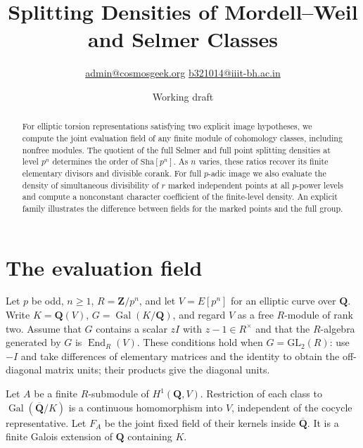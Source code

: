 \documentclass[11pt]{article}
\title{Splitting Densities of Mordell--Weil and Selmer Classes}
\author{\small\href{mailto:admin@cosmosgeek.org}{admin@cosmosgeek.org}
\quad\href{mailto:b321014@iiit-bh.ac.in}{b321014@iiit-bh.ac.in}}
\date{Working draft}
\newcommand{\Q}{\mathbf Q}
\newcommand{\Z}{\mathbf Z}
\newcommand{\Sha}{\mathrm{Sha}}
\newcommand{\GL}{\mathrm{GL}}
\begin{document}
\maketitle
\begin{abstract}
For elliptic torsion representations satisfying two explicit image
hypotheses, we compute the joint evaluation field of any finite module of
cohomology classes, including nonfree modules. The quotient of the full
Selmer and full point splitting densities at level $p^n$ determines the
order of $\Sha[p^n]$. As $n$ varies, these ratios recover its finite
elementary divisors and divisible corank. For full $p$-adic image we also
evaluate the density of simultaneous divisibility of $r$ marked independent
points at all $p$-power levels and compute a nonconstant character
coefficient of the finite-level density. An explicit family illustrates
the difference between fields for the marked points and the full group.
\end{abstract}

\section{The evaluation field}
Let $p$ be odd, $n\ge1$, $R=\Z/p^n$, and let $V=E[p^n]$ for an
elliptic curve over $\Q$. Write $K=\Q(V)$, $G=\operatorname{Gal}(K/\Q)$,
and regard $V$ as a free $R$-module of rank two. Assume that $G$
contains a scalar $zI$ with $z-1\in R^\times$ and that the $R$-algebra
generated by $G$ is $\operatorname{End}_R(V)$. These conditions hold
when $G=\GL_2(R)$: use $-I$ and take differences of elementary matrices
and the identity to obtain the off-diagonal matrix units; their products
give the diagonal units.

Let $A$ be a finite $R$-submodule of $H^1(\Q,V)$. Restriction of each
class to $\operatorname{Gal}(\overline{\Q}/K)$ is a continuous
homomorphism into $V$, independent of the cocycle representative.
Let $F_A$ be the joint fixed field of their kernels inside
$\overline{\Q}$. It is a finite Galois extension of $\Q$ containing $K$.
\end{document}
